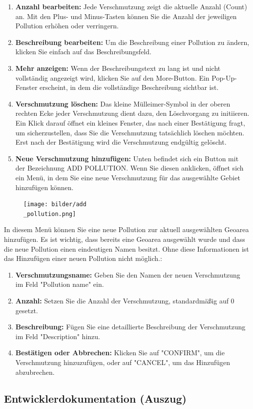 \documentclass[a4paper,12pt]{article}
\begin{document}
\begin{enumerate}
    \item \textbf{Anzahl bearbeiten:} Jede Verschmutzung zeigt die aktuelle Anzahl (Count) an. Mit den Plus- und Minus-Tasten können Sie die Anzahl der jeweiligen Pollution erhöhen oder verringern.
    \item \textbf{Beschreibung bearbeiten:} Um die Beschreibung einer Pollution zu ändern, klicken Sie einfach auf das Beschreibungsfeld. 
    \item \textbf{Mehr anzeigen:} Wenn der Beschreibungstext zu lang ist und nicht vollständig angezeigt wird, klicken Sie auf den \glqq More\grqq{}-Button. Ein Pop-Up-Fenster erscheint, in dem die vollständige Beschreibung sichtbar ist.
   \item \textbf{Verschmutzung löschen:} Das kleine Mülleimer-Symbol in der oberen rechten Ecke jeder Verschmutzung dient dazu, den Löschvorgang zu initiieren. Ein Klick darauf öffnet ein kleines Fenster, das nach einer Bestätigung fragt, um sicherzustellen, dass Sie die Verschmutzung tatsächlich löschen möchten. Erst nach der Bestätigung wird die Verschmutzung endgültig gelöscht.
    \item \textbf{Neue Verschmutzung hinzufügen:} Unten befindet sich ein Button mit der Bezeichnung \glqq ADD POLLUTION\grqq{}. Wenn Sie diesen anklicken, öffnet sich ein Menü, in dem Sie eine neue Verschmutzung für das ausgewählte Gebiet hinzufügen können.
\end{enumerate}

\begin{figure}[h]
\centering
\texttt{[image: bilder/add\\\_pollution.png]}
\end{figure}

\noindent In diesem Menü können Sie eine neue Pollution zur aktuell ausgewählten Geoarea hinzufügen. Es ist wichtig, dass bereits eine Geoarea ausgewählt wurde und dass die neue Pollution einen eindeutigen Namen besitzt. Ohne diese Informationen ist das Hinzufügen einer neuen Pollution nicht möglich.:
\begin{enumerate}
    \item \textbf{Verschmutzungsname:} Geben Sie den Namen der neuen Verschmutzung im Feld "Pollution name" ein.
    \item \textbf{Anzahl:} Setzen Sie die Anzahl der Verschmutzung, standardmäßig auf 0 gesetzt.
    \item \textbf{Beschreibung:} Fügen Sie eine detaillierte Beschreibung der Verschmutzung im Feld "Description" hinzu.
    \item \textbf{Bestätigen oder Abbrechen:} Klicken Sie auf "CONFIRM", um die Verschmutzung hinzuzufügen, oder auf "CANCEL", um das Hinzufügen abzubrechen.
\end{enumerate}


\clearpage
\subsection{Entwicklerdokumentation (Auszug)}
\label{sec:entwicklerdokumentation}
\end{document}
